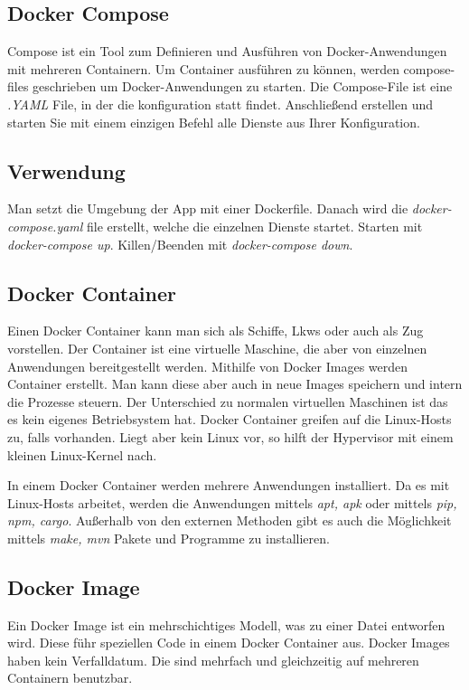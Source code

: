 \subsection{Docker Compose}
\cite{Docker-Compose}
Compose ist ein Tool zum Definieren und Ausführen von Docker-Anwendungen mit mehreren Containern. 
Um Container ausführen zu können, werden compose-files geschrieben um Docker-Anwendungen zu starten.
Die Compose-File ist eine \textit{.YAML} File, in der die konfiguration statt findet. 
Anschließend erstellen und starten Sie mit einem einzigen Befehl alle Dienste aus Ihrer Konfiguration.


\subsection{Verwendung}

Man setzt die Umgebung der App mit einer Dockerfile.
Danach wird die \textit{docker-compose.yaml} file erstellt, welche die einzelnen Dienste startet.
Starten mit \textit{docker-compose up}.
Killen/Beenden mit \textit{docker-compose down}.


\subsection{Docker Container}
\cite{Docker-Container}
Einen Docker Container kann man sich als Schiffe, Lkws oder auch als Zug vorstellen. Der Container ist eine virtuelle Maschine, die aber von einzelnen Anwendungen bereitgestellt werden.
Mithilfe von Docker Images werden Container erstellt. Man kann diese aber auch in neue Images speichern und intern die Prozesse steuern.
Der Unterschied zu normalen virtuellen Maschinen ist das es kein eigenes Betriebsystem hat. Docker Container greifen auf die Linux-Hosts
zu, falls vorhanden. Liegt aber kein Linux vor, so hilft der Hypervisor mit einem kleinen Linux-Kernel nach. 


In einem Docker Container werden mehrere Anwendungen installiert. Da es mit Linux-Hosts arbeitet, werden 
die Anwendungen mittels \textit{apt, apk} oder mittels \textit{pip, npm, cargo}. Außerhalb von den externen Methoden
gibt es auch die Möglichkeit mittels \textit{make, mvn} Pakete und Programme zu installieren.

\subsection{Docker Image}

Ein Docker Image ist ein mehrschichtiges Modell, was zu einer Datei entworfen wird. Diese führ speziellen Code in einem Docker Container aus.
Docker Images haben kein Verfalldatum. Die sind mehrfach und gleichzeitig auf mehreren Containern benutzbar.

